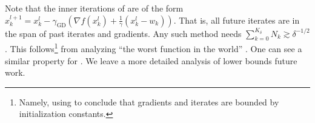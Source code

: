 \documentclass[11pt]{article}
\begin{document}
\begin{remark}
Note that the inner iterations of  are of the form $x_{k}^{l+1} = x_{k}^l - \gamma_{\mathrm{GD}}(\nabla f(x_k^l) + \frac{1}{\gamma}(x_k^l - w_k))$.
That is, all future iterates are in the span of past iterates and gradients.
Any such method needs $\sum_{k=0}^{K_\delta}N_k \gtrsim \delta^{-1/2}$.
This follows\footnote{Namely, using  to conclude that gradients and iterates are bounded by initialization constants.} from analyzing ``the worst function in the world'' \citep[Section 2.1.2]{nesterov2004introductory}.
One can see a similar property for .
We leave a more detailed analysis of lower bounds future work.
\end{remark}
\end{document}
